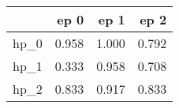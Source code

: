 \begin{tabular}{lrrr}
\toprule
{} &   ep 0 &   ep 1 &   ep 2 \\
\midrule
hp\_0 &  0.958 &  1.000 &  0.792 \\
hp\_1 &  0.333 &  0.958 &  0.708 \\
hp\_2 &  0.833 &  0.917 &  0.833 \\
\bottomrule
\end{tabular}
